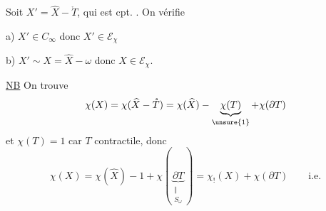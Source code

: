 
Soit $X'=\widehat X-\mathring T$, qui est cpt. . On vérifie


a) $X'\in C_\infty$ donc $X'\in\mathcal E_\chi$

b) $X'\sim X=\widehat X-\omega$ donc $X\in\mathcal E_\chi$.

\uline{NB} On trouve
\[
\chi(X)=\chi(\widehat X-\mathring T)=\chi(\widehat X)-\underbrace{\chi(T)}_{\unsure{1}}+\chi(\partial T)
\]
et $\chi(T)=1$ car $T$ contractile, donc
\[
\chi(X)=\chi(\widehat X)-1+\chi(\underbrace{\partial T}_{\substack{\Vert\\S_\omega}})=\chi_!(X)+\chi(\partial T)\qquad\text{i.e.}
\]

